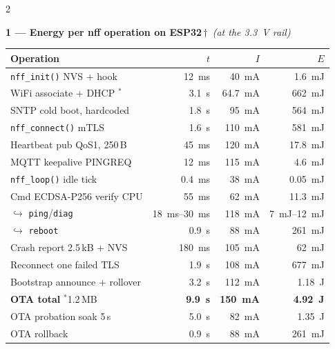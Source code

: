 \documentclass[9pt,a4paper]{extarticle}
\newcommand{\meas}{\textcolor{ok}{$^{\ast}$}}
\newcommand{\mock}{\textcolor{warn}{$\dagger$}}
\begin{document}
\begin{multicols}{2}

{\scriptsize
\textbf{1 --- Energy per nff operation on ESP32}\,\mock\ \textit{(at the \SI{3.3}{\volt} rail)}\\[0.5mm]
\begin{tabular}{@{}p{27mm}rrr@{}}
\toprule
\textbf{Operation} & \textbf{$t$} & \textbf{$I$} & \textbf{$E$} \\
\midrule
\texttt{nff\_init()} \tiny NVS + hook  & \SI{12}{\milli\second}  & \SI{40}{\milli\ampere}  & \SI{1.6}{\milli\joule} \\
WiFi associate + DHCP \meas             & \SI{3.1}{\second}       & \SI{64.7}{\milli\ampere}& \SI{662}{\milli\joule} \\
SNTP \tiny cold boot, hardcoded         & \SI{1.8}{\second}       & \SI{95}{\milli\ampere}  & \SI{564}{\milli\joule} \\
\texttt{nff\_connect()} \tiny mTLS      & \SI{1.6}{\second}       & \SI{110}{\milli\ampere} & \SI{581}{\milli\joule} \\
Heartbeat pub \tiny QoS1, 250\,B        & \SI{45}{\milli\second}  & \SI{120}{\milli\ampere} & \SI{17.8}{\milli\joule} \\
MQTT keepalive PINGREQ                  & \SI{12}{\milli\second}  & \SI{115}{\milli\ampere} & \SI{4.6}{\milli\joule} \\
\texttt{nff\_loop()} idle tick          & \SI{0.4}{\milli\second} & \SI{38}{\milli\ampere}  & \SI{0.05}{\milli\joule} \\
Cmd ECDSA-P256 verify \tiny CPU         & \SI{55}{\milli\second}  & \SI{62}{\milli\ampere}  & \SI{11.3}{\milli\joule} \\
\;$\hookrightarrow$ \texttt{ping}/\texttt{diag} & \SIrange{18}{30}{\milli\second} & \SI{118}{\milli\ampere} & \SIrange{7}{12}{\milli\joule} \\
\;$\hookrightarrow$ \texttt{reboot}     & \SI{0.9}{\second}       & \SI{88}{\milli\ampere}  & \SI{261}{\milli\joule} \\
Crash report \tiny 2.5\,kB + NVS        & \SI{180}{\milli\second} & \SI{105}{\milli\ampere} & \SI{62}{\milli\joule} \\
Reconnect \tiny one failed TLS          & \SI{1.9}{\second}       & \SI{108}{\milli\ampere} & \SI{677}{\milli\joule} \\
Bootstrap announce + rollover           & \SI{3.2}{\second}       & \SI{112}{\milli\ampere} & \SI{1.18}{\joule} \\
\midrule
\textbf{OTA total} \meas \tiny 1.2\,MB  & \textbf{\SI{9.9}{\second}} & \textbf{\SI{150}{\milli\ampere}} & \textbf{\SI{4.92}{\joule}} \\
OTA probation soak \tiny 5\,s           & \SI{5.0}{\second}       & \SI{82}{\milli\ampere}  & \SI{1.35}{\joule} \\
OTA rollback                            & \SI{0.9}{\second}       & \SI{88}{\milli\ampere}  & \SI{261}{\milli\joule} \\
\bottomrule
\end{tabular}

}
\end{multicols}
\end{document}
